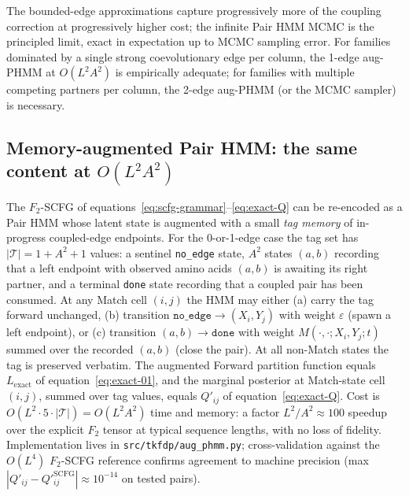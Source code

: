 The bounded-edge approximations capture progressively more of the
coupling correction at progressively higher cost; the infinite Pair
HMM MCMC is the principled limit, exact in expectation up to MCMC
sampling error. For families dominated by a single strong
coevolutionary edge per column, the 1-edge aug-PHMM at $O(L^2 A^2)$
is empirically adequate; for families with multiple competing
partners per column, the 2-edge aug-PHMM (or the MCMC sampler) is
necessary.

\subsection{Memory-augmented Pair HMM: the same content at $O(L^2 A^2)$}
\label{sec:aug-phmm}

The $F_2$-SCFG of equations~\ref{eq:scfg-grammar}--\ref{eq:exact-Q}
can be re-encoded as a Pair HMM whose latent state is augmented
with a small \emph{tag memory} of in-progress coupled-edge
endpoints. For the 0-or-1-edge case the tag set has
$|\mathcal{T}| = 1 + A^2 + 1$ values: a sentinel \texttt{no\_edge}
state, $A^2$ states $(a, b)$ recording that a left endpoint with
observed amino acids $(a, b)$ is awaiting its right partner, and a
terminal \texttt{done} state recording that a coupled pair has been
consumed. At any Match cell $(i, j)$ the HMM may either (a) carry
the tag forward unchanged, (b) transition
$\texttt{no\_edge} \to (X_i, Y_j)$ with weight $\varepsilon$ (spawn
a left endpoint), or (c) transition $(a, b) \to \texttt{done}$ with
weight $M(\cdot,\cdot;X_i,Y_j;t)$ summed over the recorded $(a, b)$
(close the pair). At all non-Match states the tag is preserved
verbatim. The augmented Forward partition function equals
$L_{\mathrm{exact}}$ of equation~\ref{eq:exact-01}, and the
marginal posterior at Match-state cell $(i, j)$, summed over tag
values, equals $Q'_{ij}$ of equation~\ref{eq:exact-Q}. Cost is
$O(L^2 \cdot 5 \cdot |\mathcal{T}|) = O(L^2 A^2)$ time and memory:
a factor $L^2 / A^2 \approx 100$ speedup over the explicit $F_2$
tensor at typical sequence lengths, with no loss of fidelity.
Implementation lives in \texttt{src/tkfdp/aug\_phmm.py};
cross-validation against the $O(L^4)$ $F_2$-SCFG reference
confirms agreement to machine precision (max
$|Q'_{ij} - Q'^{\mathrm{SCFG}}_{ij}| \approx 10^{-14}$ on tested
pairs).

